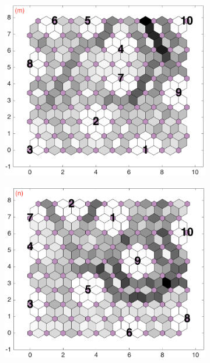 \begin{figure}
\begin{subfigure}[b]{0.25\textwidth}
        \label{fig: col3and22_dist}
    \end{subfigure}
            \hfill
    \begin{subfigure}[b]{0.25\textwidth}
        \centering
        \includegraphics[width=\textwidth]{../../images0.01/M31/2D/diff_dimension/combine_2D_data_between_cols3and23.png}
        \label{fig: col3and23_dist}
    \end{subfigure}
            \hfill
    \begin{subfigure}[b]{0.25\textwidth}
        \centering
        \includegraphics[width=\textwidth]{../../images0.01/M31/2D/diff_dimension/combine_2D_data_between_cols3and24.png}

\end{subfigure}
\end{figure}
